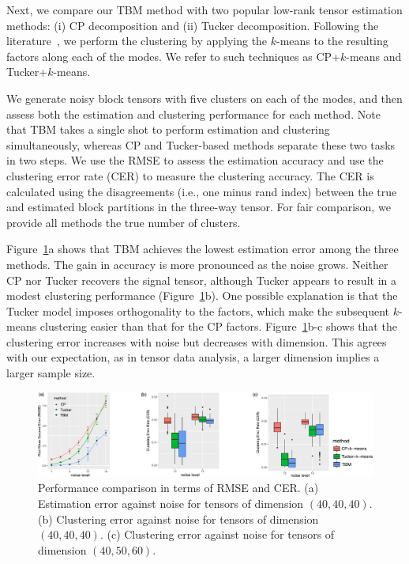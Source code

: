 \documentclass{article}
\begin{document}
Next, we compare our TBM method with two popular low-rank tensor estimation methods: (i) CP decomposition and (ii) Tucker decomposition. Following the literature~\cite{chi2018provable,hore2016tensor,kolda2008scalable}, we perform the clustering by applying the $k$-means to the resulting factors along each of the modes. We refer to such techniques as CP+$k$-means and Tucker+$k$-means. 

We generate noisy block tensors with five clusters on each of the modes, and then assess both the estimation and clustering performance for each method. Note that TBM takes a single shot to perform estimation and clustering simultaneously, whereas CP and Tucker-based methods separate these two tasks in two steps. We use the RMSE to assess the estimation accuracy and use the clustering error rate (CER) to measure the clustering accuracy. The CER is calculated using the disagreements (i.e., one minus rand index) between the true and estimated block partitions in the three-way tensor. For fair comparison, we provide all methods the true number of clusters. 

Figure~\ref{fig4}a shows that TBM achieves the lowest estimation error among the three methods. The gain in accuracy is more pronounced as the noise grows. Neither CP nor Tucker recovers the signal tensor, although Tucker appears to result in a modest clustering performance (Figure~\ref{fig4}b). One possible explanation is that the Tucker model imposes orthogonality to the factors, which make the subsequent $k$-means clustering easier than that for the CP factors. Figure~\ref{fig4}b-c shows that the clustering error increases with noise but decreases with dimension. This agrees with our expectation, as in tensor data analysis, a larger dimension implies a larger sample size. 



\begin{figure}[H]
\centering
\includegraphics[width=\textwidth]{compare}
\caption{\small Performance comparison in terms of RMSE and CER. (a) Estimation error against noise for tensors of dimension $(40,40,40)$. (b) Clustering error against noise for tensors of dimension $(40,40,40)$. (c) Clustering error against noise for tensors of dimension $(40,50,60)$.} \label{fig4}
\end{figure}
\vspace{-.5cm}
\end{document}
